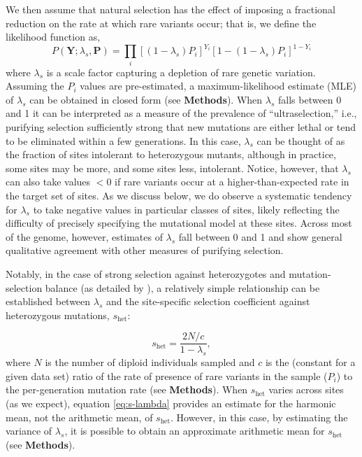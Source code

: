 \documentclass[11pt]{article}
\newcommand{\mathbb}[1]{\boldsymbol{\mathbf{#1}}}
\begin{document}
We then assume that natural selection has the effect of imposing a fractional reduction on the rate at which rare variants occur; that is, we define the likelihood function as,
\begin{equation}
  P(\mathbb{Y}; \lambda_s, \mathbb{P}) = \prod_i \left[(1-\lambda_s) P_i\right]^{Y_i}\left[1- (1-\lambda_s) P_i\right]^{1-Y_i}
\end{equation}
\noindent where $\lambda_s$ is a scale factor capturing a depletion of rare genetic variation.  Assuming the $P_i$ values are pre-estimated, a maximum-likelihood estimate (MLE) of $\lambda_s$ can be obtained in closed form (see {\bf Methods}).
When $\lambda_s$ falls between 0 and 1 it can be interpreted as a measure of the prevalence of ``ultraselection,''
i.e., purifying selection sufficiently strong that new mutations are either lethal or tend  to be eliminated within a few generations.
In this case, $\lambda_s$ can be thought of as the fraction of sites intolerant to heterozygous mutants, although in practice, some sites may be more, and some sites less, intolerant.
Notice, however, that $\lambda_s$ can also take values $<0$ if
rare variants occur at a higher-than-expected rate in the target set of sites.
As we discuss below, we do observe a systematic tendency for $\lambda_s$ to take negative values in particular classes of sites, likely reflecting the difficulty of precisely specifying the mutational model at these sites.
Across most of the genome, however, estimates of $\lambda_s$ fall between 0 and 1 and show general qualitative agreement with other measures of purifying selection.

Notably, in the case of strong selection against heterozygotes and mutation-selection balance (as detailed by \cite{CASSETAL17,FULLETAL19}),
a relatively simple relationship can be established between $\lambda_s$ and the site-specific selection coefficient against heterozygous mutations, $s_{\text{het}}$:

\begin{equation}
  s_{\text{het}} = \frac{2N/c}{1-\lambda_s},
  \label{eq:s-lambda}
  \end{equation}
  where $N$ is the number of diploid individuals sampled and $c$ is the (constant for a given data set) ratio of the rate of presence of rare variants in the sample ($P_i$) to the per-generation mutation rate (see {\bf Methods}).
When $s_{\text{het}}$ varies across sites (as we expect), equation \ref{eq:s-lambda} provides an estimate for the harmonic mean, not the arithmetic mean, of $s_{\text{het}}$.  However,
in this case, by estimating the variance of $\lambda_s$, it is possible to obtain an approximate arithmetic mean for $s_{\text{het}}$ (see {\bf Methods}).
\end{document}
